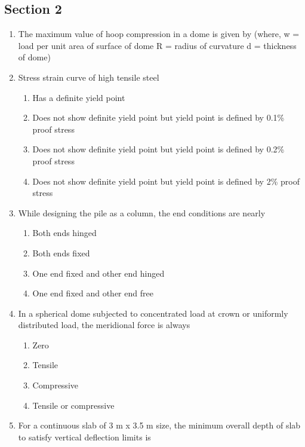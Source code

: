 \documentclass[11pt,a4paper]{article}
\begin{document}
\subsection*{Section 2}
\begin{enumerate}
\item{The maximum value of hoop compression in a dome is given by (where, w = load per unit area of surface of dome R = radius of curvature d = thickness of dome)}
\\
\item{Stress strain curve of high tensile steel}
\begin{enumerate}[label=\Alph*.]
\item{Has a definite yield point}
\item{Does not show definite yield point but yield point is defined by 0.1\% proof stress}
\item{Does not show definite yield point but yield point is defined by 0.2\% proof stress}
\item{Does not show definite yield point but yield point is defined by 2\% proof stress}
\end{enumerate}
\item{While designing the pile as a column, the end conditions are nearly}
\begin{enumerate}[label=\Alph*.]
\item{Both ends hinged}
\item{Both ends fixed}
\item{One end fixed and other end hinged}
\item{One end fixed and other end free}
\end{enumerate}
\item{In a spherical dome subjected to concentrated load at crown or uniformly distributed load, the meridional force is always}
\begin{enumerate}[label=\Alph*.]
\item{Zero}
\item{Tensile}
\item{Compressive}
\item{Tensile or compressive}
\end{enumerate}
\item{For a continuous slab of 3 m x 3.5 m size, the minimum overall depth of slab to satisfy vertical deflection limits is}

\end{enumerate}
\end{document}
